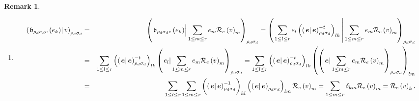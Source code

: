 \documentclass[aps,preprint]{revtex4}
\newtheorem{remark}[theorem]{Remark}
\begin{document}
\begin{remark}
\begin{enumerate}
\item 
\begin{eqnarray}
\left( \left. \mathfrak{b}_{\rho _{d}\sigma _{d}e}\left( e_{k}\right)
\right\vert v\right) _{\rho _{d}\sigma _{d}} &=&\left( \left. \overset{}{%
\mathfrak{b}_{\rho _{d}\sigma _{d}e}\left( e_{k}\right) }\right\vert
\sum_{1\leq m\leq r}e_{m}\mathcal{R}_{e}\left( v\right) _{m}\right) _{\rho
_{d}\sigma _{d}}=\left( \left. \sum_{1\leq l\leq r}e_{l}\left( \overset{}{%
\left( \left. \boldsymbol{e}\right\vert \boldsymbol{e}\right) _{\rho
_{d}\sigma _{d}}^{-t}}\right) _{lk}\overset{}{}\right\vert \sum_{1\leq m\leq
r}e_{m}\mathcal{R}_{e}\left( v\right) _{m}\right) _{\rho _{d}\sigma _{d}} \\
&=&\sum_{1\leq l\leq r}\left( \overset{}{\left( \left. \boldsymbol{e}%
\right\vert \boldsymbol{e}\right) _{\rho _{d}\sigma _{d}}^{-t}}\right)
_{lk}\left( \left. \overset{}{e_{l}}\right\vert \sum_{1\leq m\leq r}e_{m}%
\mathcal{R}_{e}\left( v\right) _{m}\right) _{\rho _{d}\sigma
_{d}}=\sum_{1\leq l\leq r}\left( \overset{}{\left( \left. \boldsymbol{e}%
\right\vert \boldsymbol{e}\right) _{\rho _{d}\sigma _{d}}^{-t}}\right)
_{lk}\left( \overset{}{\left( \left. \boldsymbol{e}\right\vert \sum_{1\leq
m\leq r}e_{m}\mathcal{R}_{e}\left( v\right) _{m}\right) _{\rho _{d}\sigma
_{d}}}\right) _{lm} \\
&=&\sum_{1\leq l\leq r}\sum_{1\leq m\leq r}\left( \overset{}{\left( \left. 
\boldsymbol{e}\right\vert \boldsymbol{e}\right) _{\rho _{d}\sigma _{d}}^{-1}}%
\right) _{kl}\left( \overset{}{\left( \left. \boldsymbol{e}\right\vert 
\boldsymbol{e}\right) _{\rho _{d}\sigma _{d}}}\right) _{lm}\mathcal{R}%
_{e}\left( v\right) _{m}=\sum_{1\leq m\leq r}\delta _{km}\mathcal{R}%
_{e}\left( v\right) _{m}=\mathcal{R}_{e}\left( v\right) _{k}.
\end{eqnarray}
\end{enumerate}
\end{remark}
\end{document}
